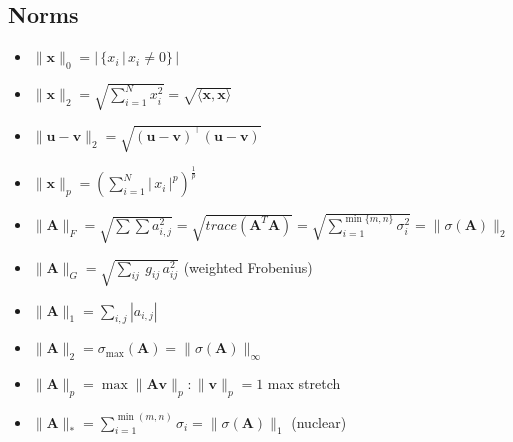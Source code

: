\subsection*{Norms}
\begin{itemize}
	\item $\|\mathbf{x}\|_0 = |\,\{x_i \,|\, x_i \neq 0\}\,|$ 
	\item $\|\mathbf{x}\|_2 = \sqrt{\sum_{i=1}^{N} x_i^2} = \sqrt{\langle \mathbf{x}, \mathbf{x} \rangle}$ 
	\item $\|\mathbf{u}-\mathbf{v}\|_2 = \sqrt{(\mathbf{u}-\mathbf{v})^\top(\mathbf{u}-\mathbf{v})}$
	\item $\|\mathbf{x}\|_p = \left( \sum_{i=1}^{N} |\,x_i\,|^p \right)^{\frac{1}{p}}$
	\item
	$\|\mathbf{A}\|_F = \sqrt{\sum \sum a_{i,j}^2} = \sqrt{trace(\mathbf{A}^T\mathbf{A})} = \sqrt{\sum_{i=1}^{\min\{m, n\}} \sigma_i^2} \allowbreak = \|\sigma(\mathbf{A})\|_2  $\\
	\item $\|\mathbf{A}\|_G=\sqrt{\sum_{ij}\ {g_{ij}\,a^2_{ij}}}$ (weighted Frobenius)
	\item
	$\|\mathbf{A}\|_1 = \sum_{i,j} | a_{i,j}|$ \\
	\item $\|\mathbf{A}\|_2 = \sigma_{\text{max}}(\mathbf{A}) = \|\sigma(\mathbf{A})\|_\infty$
	\item $\|\mathbf{A}\|_p = \max \|\mathbf{A}\mathbf{v}\|_p : \|\mathbf{v}\|_p=1$ max stretch
	\item $\|\mathbf{A}\|_* = \sum_{i=1}^{\min(m, n)} \sigma_i = \|\sigma(\mathbf{A})\|_1$ (nuclear)
\end{itemize}

